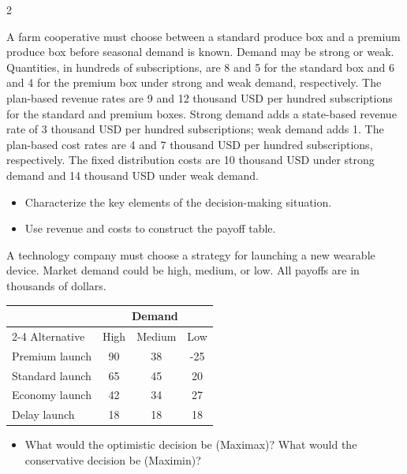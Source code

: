 \begin{multicols}{2}
		
		A farm cooperative must choose between a standard produce box and a premium produce box before seasonal demand is known. Demand may be strong or weak. Quantities, in hundreds of subscriptions, are 8 and 5 for the standard box and 6 and 4 for the premium box under strong and weak demand, respectively. The plan-based revenue rates are 9 and 12 thousand USD per hundred subscriptions for the standard and premium boxes. Strong demand adds a state-based revenue rate of 3 thousand USD per hundred subscriptions; weak demand adds 1. The plan-based cost rates are 4 and 7 thousand USD per hundred subscriptions, respectively. The fixed distribution costs are 10 thousand USD under strong demand and 14 thousand USD under weak demand.
		
		\begin{itemize}
			\item [\textbf{(C1)}] Characterize the key elements of the decision-making situation. 
			\item [\textbf{(C3)}] Use revenue and costs to construct the payoff table. 
		\end{itemize}
		
		\newpage
		A technology company must choose a strategy for launching a new wearable device. Market demand could be high, medium, or low. All payoffs are in thousands of dollars.
		
		\begin{center}
			\renewcommand{\arraystretch}{1.3}
			\small
			\begin{tabular}{lccc}
				\toprule
				& \multicolumn{3}{c}{Demand} \\
				\cmidrule(lr){2-4}
				Alternative & High & Medium & Low \\
				\midrule
				Premium launch & 90 & 38 & -25 \\
				Standard launch & 65 & 45 & 20 \\
				Economy launch & 42 & 34 & 27 \\
				Delay launch & 18 & 18 & 18 \\
				\bottomrule
			\end{tabular}
		\end{center}
		
		
		\begin{itemize}
			\item [\textbf{(C4)}] What would the optimistic decision be (Maximax)? What would the conservative decision be (Maximin)? 
		\end{itemize}
		

\end{multicols}
